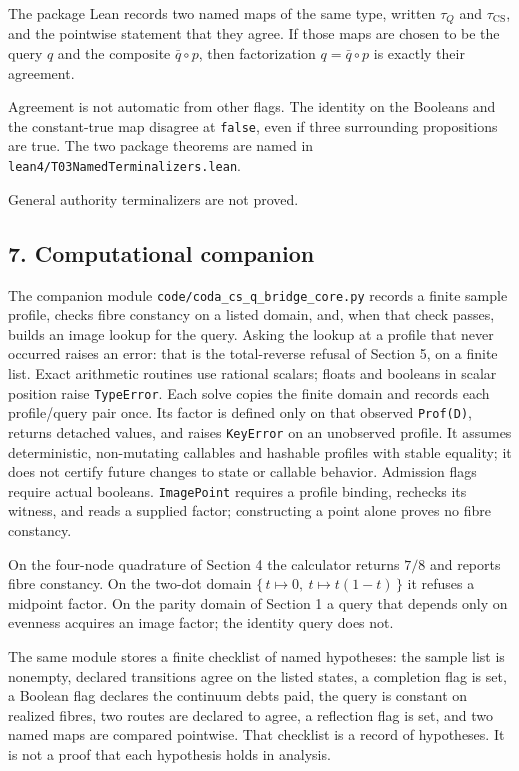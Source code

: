 \documentclass[
  11pt,
]{article}
\begin{document}
The package Lean records two named maps of the same type, written \(\tau_Q\) and \(\tau_{\mathrm{CS}}\), and the pointwise statement that they agree. If those maps are chosen to be the query \(q\) and the composite \(\bar{q}\circ p\), then factorization \(q=\bar{q}\circ p\) is exactly their agreement.

Agreement is not automatic from other flags. The identity on the Booleans and the constant-true map disagree at \texttt{false}, even if three surrounding propositions are true. The two package theorems are named in \nolinkurl{lean4/T03NamedTerminalizers.lean}.

General authority terminalizers are not proved.

\subsection{7. Computational companion}\label{computational-companion}

The companion module \nolinkurl{code/coda_cs_q_bridge_core.py} records a finite sample profile, checks fibre constancy on a listed domain, and, when that check passes, builds an image lookup for the query. Asking the lookup at a profile that never occurred raises an error: that is the total-reverse refusal of Section 5, on a finite list. Exact arithmetic routines use rational scalars; floats and booleans in scalar position raise \texttt{TypeError}. Each solve copies the finite domain and records each profile/query pair once. Its factor is defined only on that observed \texttt{Prof(D)}, returns detached values, and raises \texttt{KeyError} on an unobserved profile. It assumes deterministic, non-mutating callables and hashable profiles with stable equality; it does not certify future changes to state or callable behavior. Admission flags require actual booleans. \texttt{ImagePoint} requires a profile binding, rechecks its witness, and reads a supplied factor; constructing a point alone proves no fibre constancy.

On the four-node quadrature of Section 4 the calculator returns \(7/8\) and reports fibre constancy. On the two-dot domain \(\{\,t\mapsto 0,\ t\mapsto t(1-t)\,\}\) it refuses a midpoint factor. On the parity domain of Section 1 a query that depends only on evenness acquires an image factor; the identity query does not.

The same module stores a finite checklist of named hypotheses: the sample list is nonempty, declared transitions agree on the listed states, a completion flag is set, a Boolean flag declares the continuum debts paid, the query is constant on realized fibres, two routes are declared to agree, a reflection flag is set, and two named maps are compared pointwise. That checklist is a record of hypotheses. It is not a proof that each hypothesis holds in analysis.
\end{document}
